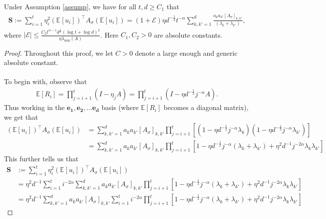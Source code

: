 \documentclass[10pt,a4paper]{amsart}
\begin{document}
\begin{lemma}\label{variance-simplification}
Under Assumption \ref{assump}, we have for all $t,d \geq C_1$ that
\begin{align*}
\mathbf{S}:= \sum_{i = 1}^t \eta_i^2 (\mathbb{E}[u_i])^\top  A_{\sigma} (\mathbb{E}[u_i]) = (1 + \mathcal E)\eta d^{-\frac{1}{2}}t^{-\alpha}\sum_{k,k' = 1}^d \frac{a_{k}a_{k'}[A_{\sigma}]_{k,k'}}{(\lambda_k + \lambda_{k'})},
\end{align*}
where $|\mathcal E| \leq \frac{C_2 t^{\alpha - 1}d^{\frac{1}{2}}(\log t + \log d)^2}{\eta \lambda_{\min}(A)}$. Here $C_1, C_2 > 0$ are absolute constants. 
\end{lemma}

\begin{proof} 
Throughout this proof, we let $C > 0$ denote a large enough and generic absolute constant.
\\\\
To begin with, observe that
\begin{align*}
    \mathbb{E}[R_i] = \prod_{j = i+1}^{t}(I - \eta_{j}A) = \prod_{j = i+1}^{t}(I - \eta d^{-\frac{1}{2}}j^{-\alpha}A).
\end{align*}
Thus working in the $\mathbf{e_1}, \mathbf{e_2}, \dots \mathbf{e_d}$ basis (where  $\mathbb{E}[R_i]$ becomes a diagonal matrix), we get that
\begin{align*}
(\mathbb{E}[u_i])^\top A_{\sigma} (\mathbb{E}[u_i]) &= \sum_{k,k' = 1}^d a_k a_{k'} [ A_{\sigma}]_{k,k'} \prod_{j = i+1}^t[(1 - \eta d^{-\frac{1}{2}}j^{-\alpha}\lambda_{k})(1 - \eta d^{-\frac{1}{2}}j^{-\alpha}\lambda_{k'})]
\\
&= \sum_{k,k' = 1}^d a_k a_{k'} [A_{\sigma}]_{k,k'} \prod_{j = i+1}^t[1 - \eta d^{-\frac{1}{2}}j^{-\alpha}(\lambda_k + \lambda_{k'}) + \eta^2 d^{-1} j^{-2\alpha} \lambda_k \lambda_{k'}]
\end{align*}
This further tells us that
\begin{align*}
\mathbf{S} &:= \sum_{i = 1}^t \eta_i^2 (\mathbb{E}[u_i])^\top  A_{\sigma} (\mathbb{E}[u_i])
\\
&=\eta^2d^{-1}\sum_{i = 1}^t i^{-2\alpha}\sum_{k,k' = 1}^d a_k a_{k'}[A_{\sigma}]_{k,k'} \prod_{j=i+1}^t[1 - \eta d^{-\frac{1}{2}} j^{-\alpha} (\lambda_k + \lambda_{k'}) + \eta^2 d^{-1} j^{-2\alpha} \lambda_{k} \lambda_{k'}]
\\
&= \eta^2d^{-1}\sum_{k,k' = 1}^d a_k a_{k'}[A_{\sigma}]_{k,k'} \sum_{i = 1}^ti^{-2\alpha}\prod_{j=i+1}^t[1 - \eta d^{-\frac{1}{2}} j^{-\alpha} (\lambda_k + \lambda_{k'}) + \eta^2 d^{-1} j^{-2\alpha} \lambda_{k} \lambda_{k'}]

\end{align*}
\end{proof}
\end{document}
